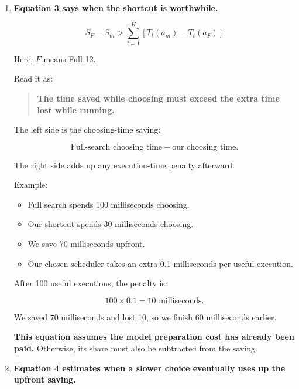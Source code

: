 \documentclass[11pt,a4paper]{article}
\providecommand{\tightlist}{\setlength{\itemsep}{0pt}\setlength{\parskip}{3pt}}
\begin{document}
\begin{enumerate}
  For that example:

  \[
  \rho_m=\frac{10}{11}\approx90.9\%.
  \]

  We retain about 90.9\% of the reference speed.

  This distinction matters: \textbf{10\% more execution time does not mean exactly 10\% less speed}, because speed is the inverse of time.

  The paper's other example is:

  \[
  \frac{1}{1.05}\approx95.24\%.
  \]

  A 5\% time penalty retains about 95.24\% of the reference speed.
\item
  \textbf{Equation 3 says when the shortcut is worthwhile.}

  \[
  S_F-S_m
  >
  \sum_{t=1}^{H}
  \left[T_t(a_m)-T_t(a_F)\right]
  \]

  Here, \(F\) means Full 12.

  Read it as:

  \begin{quote}
  \textbf{The time saved while choosing must exceed the extra time lost while running.}
  \end{quote}

  The left side is the choosing-time saving:

  \[
  \text{Full-search choosing time}-\text{our choosing time}.
  \]

  The right side adds up any execution-time penalty afterward.

  Example:

  \begin{itemize}
  \tightlist
  \item
    Full search spends 100 milliseconds choosing.
  \item
    Our shortcut spends 30 milliseconds choosing.
  \item
    We save 70 milliseconds upfront.
  \item
    Our chosen scheduler takes an extra 0.1 milliseconds per useful execution.
  \end{itemize}

  After 100 useful executions, the penalty is:

  \[
  100\times0.1=10\text{ milliseconds}.
  \]

  We saved 70 milliseconds and lost 10, so we finish 60 milliseconds earlier.

  \textbf{This equation assumes the model preparation cost has already been paid.} Otherwise, its share must also be subtracted from the saving.
\item
  \textbf{Equation 4 estimates when a slower choice eventually uses up the upfront saving.}


\end{enumerate}
\end{document}
